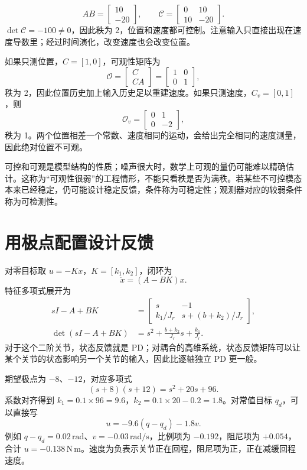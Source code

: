 \begin{examplebox}[算例 12A 教学关节的可控性和可观性]
\[
AB=\begin{bmatrix}10\\-20\end{bmatrix},\qquad
\mathcal C=\begin{bmatrix}0&10\\10&-20\end{bmatrix}.
\]
$\det\mathcal C=-100\ne0$，因此秩为 2，位置和速度都可控制。注意输入只直接出现在速度导数里；经过时间演化，改变速度也会改变位置。

如果只测位置，$C=[1,0]$，可观性矩阵为
\[
\mathcal O=\begin{bmatrix}C\\CA\end{bmatrix}
=\begin{bmatrix}1&0\\0&1\end{bmatrix},
\]
秩为 2，因此位置历史加上输入历史足以重建速度。如果只测速度，$C_v=[0,1]$，则
\[
\mathcal O_v=\begin{bmatrix}0&1\\0&-2\end{bmatrix},
\]
秩为 1。两个位置相差一个常数、速度相同的运动，会给出完全相同的速度测量，因此绝对位置不可观。
\end{examplebox}

可控和可观是模型结构的性质；噪声很大时，数学上可观的量仍可能难以精确估计。这称为“可观性很弱”的工程情形，不能只看秩是否为满秩。若某些不可控模态本来已经稳定，仍可能设计稳定反馈，条件称为可稳定性；观测器对应的较弱条件称为可检测性。

\section{用极点配置设计反馈}

对零目标取 $u=-Kx$，$K=[k_1,k_2]$，闭环为
\[
\dot x=(A-BK)x.
\]
特征多项式展开为
\begin{align}
sI-A+BK&=
\begin{bmatrix}s&-1\\k_1/J_r&s+(b+k_2)/J_r\end{bmatrix},\\
\det(sI-A+BK)&=s^2+\frac{b+k_2}{J_r}s+\frac{k_1}{J_r}.
\end{align}
对于这个二阶关节，状态反馈就是 PD；对耦合的高维系统，状态反馈矩阵可以让某个关节的状态影响另一个关节的输入，因此比逐轴独立 PD 更一般。

\begin{examplebox}[算例 12B 把闭环极点放在两个指定位置]
期望极点为 $-8$、$-12$，对应多项式
\[
(s+8)(s+12)=s^2+20s+96.
\]
系数对齐得到 $k_1=0.1\times96=9.6$，$k_2=0.1\times20-0.2=1.8$。对常值目标 $q_d$，可以直接写
\[
u=-9.6(q-q_d)-1.8v.
\]
例如 $q-q_d=0.02\,\mathrm{rad}$、$v=-0.03\,\mathrm{rad/s}$，比例项为 $-0.192$，阻尼项为 $+0.054$，合计 $u=-0.138\,\mathrm{N\,m}$。速度为负表示关节正在回程，阻尼项为正，正在减缓回程速度。
\end{examplebox}

